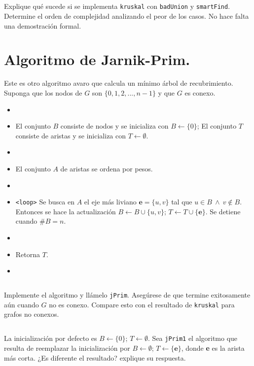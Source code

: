 \subsection{} Explique qué sucede si se implementa \texttt{kruskal} con \texttt{badUnion} y \texttt{smartFind}. Determine el orden de complejidad analizando el peor de los casos. No hace falta una demostración formal.

%

\section{Algoritmo de Jarnik-Prim.}
Este es otro algoritmo avaro que calcula un mínimo árbol de recubrimiento. Suponga que los nodos de $G$ son $\{0,1,2,...,n-1\}$ y que $G$ es conexo.

\begin{itemize}
\item[] 
\item El conjunto $B$ consiste de nodos y se inicializa con $B \leftarrow \{0\}$; El conjunto $T$ consiste de aristas y se inicializa con $T \leftarrow \emptyset$.
\item[] 
\item El conjunto $A$ de aristas se ordena por pesos.
\item[] 
\item \texttt{<loop>} Se busca en $A$ el eje más liviano $\mathbf{e} = \{u,v\}$ tal que $u \in B \ \land \ v \notin B$. Entonces se hace la actualización $B \leftarrow B \cup \{u,v\}$; $T \leftarrow T \cup \{\mathbf{e}\}$. Se detiene cuando $\# B = n$.
\item[] 
\item Retorna $T$.
\item[] 
\end{itemize}

\subsection{} Implemente el algoritmo y llámelo \texttt{jPrim}. Asegúrese de que termine exitosamente aún cuando $G$ no es conexo. Compare esto con el resultado de \texttt{kruskal} para grafos no conexos.
\subsection{} La inicialización por defecto es $B \leftarrow \{0\}$; $T \leftarrow \emptyset$. Sea \texttt{jPrim1} el algoritmo que resulta de reemplazar la inicialización por $B \leftarrow \emptyset$; $T \leftarrow \{\mathbf{e}\}$, donde \textbf{e} es la arista más corta. ¿Es diferente el resultado? explique su respuesta.
%

